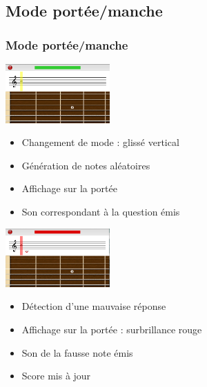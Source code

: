 \documentclass{beamer}
\begin{document}
	\subsection{Mode portée/manche}
		\begin{frame}
			\frametitle{Mode portée/manche}

			\begin{minipage}{0.35\linewidth}
				\includegraphics[width=4cm]{images/portee_first_question.png}
			\end{minipage}\hfill
			\begin{minipage}{0.6\linewidth}
				
				\begin{itemize}
					\item Changement de mode : glissé vertical
					\item Génération de notes aléatoires
					\item Affichage sur la portée
					\item Son correspondant à la question émis
				\end{itemize}
			\end{minipage}
			\bigbreak
			\pause
			\begin{minipage}{0.35\linewidth}
				\includegraphics[width=4cm]{images/portee_bad_answer.png}
			\end{minipage}\hfill
			\begin{minipage}{0.6\linewidth}
				
				\begin{itemize}
					\item Détection d'une mauvaise réponse
					\item Affichage sur la portée : surbrillance rouge
					\item Son de la fausse note émis
					\item Score mis à jour
				\end{itemize}
			\end{minipage}
		\end{frame}	
\end{document}
